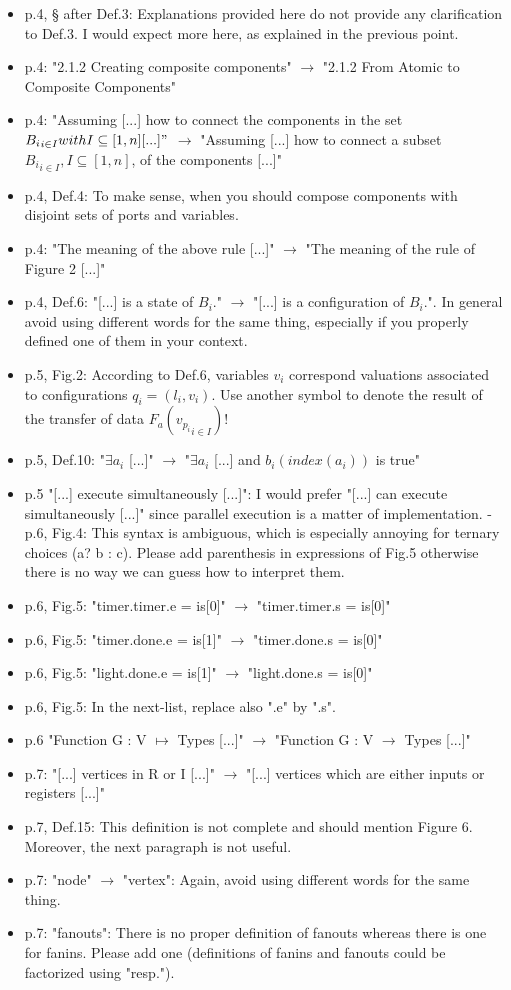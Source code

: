\begin{itemize}
\item p.4, § after Def.3: Explanations provided here do not provide any 
clarification to Def.3. I would expect more here, as explained in the 
previous point.
\item p.4: "2.1.2 Creating composite components" $\rightarrow$ "2.1.2 From Atomic to 
Composite Components"
\item p.4: "Assuming [...] how to connect the components in the set ${B_i}_{i \in 
I} with I \subseteq [1,n] [...]"$ $\rightarrow$ "Assuming [...] how to connect a subset 
${B_i}_{i \in I}, I \subseteq [1,n]$, of the components [...]"
\item p.4, Def.4: To make sense, when you should compose components with disjoint 
sets of ports and variables.
\item p.4: "The meaning of the above rule [...]" $\rightarrow$ "The meaning of the rule of 
Figure 2 [...]"
\item p.4, Def.6: "[...] is a state of $B_i$." $\rightarrow$ "[...] is a configuration of 
$B_i$.". In general avoid using different words for the same thing, especially 
if you properly defined one of them in your context.
\item p.5, Fig.2: According to Def.6, variables $v_i$ correspond valuations 
associated to configurations $q_i = (l_i, v_i)$. Use another symbol to denote 
the result of the transfer of data $F_a({ v_{p_i} }_{i \in I})$!
\item p.5, Def.10: "$\exists a_i$ [...]" $\rightarrow$ "$\exists a_i$ [...] and $b_i(index(a_i))$ is 
true"
\item p.5 "[...] execute simultaneously [...]": I would prefer "[...] can execute 
simultaneously [...]" since parallel execution is a matter of implementation.
- p.6, Fig.4: This syntax is ambiguous, which is especially annoying for 
ternary choices (a? b : c). Please add parenthesis in expressions of Fig.5 
otherwise there is no way we can guess how to interpret them.
\item p.6, Fig.5: "timer.timer.e = is[0]" $\rightarrow$ "timer.timer.s = is[0]"
\item p.6, Fig.5: "timer.done.e = is[1]" $\rightarrow$ "timer.done.s = is[0]"
\item p.6, Fig.5: "light.done.e = is[1]" $\rightarrow$ "light.done.s = is[0]"
\item p.6, Fig.5: In the next-list, replace also ".e" by ".s".
\item p.6 "Function G : V $\mapsto$ Types [...]" $\rightarrow$ "Function G : V $\to$ Types 
[...]"
\item p.7: "[...] vertices in R or I [...]" $\rightarrow$ "[...] vertices which are either 
inputs or registers [...]"
\item p.7, Def.15: This definition is not complete and should mention Figure 6. 
Moreover, the next paragraph is not useful.
\item p.7: "node" $\rightarrow$ "vertex": Again, avoid using different words for the same 
thing.
\item p.7: "fanouts": There is no proper definition of fanouts whereas there is 
one for fanins. Please add one (definitions of fanins and fanouts could be 
factorized using "resp.").


\end{itemize}

